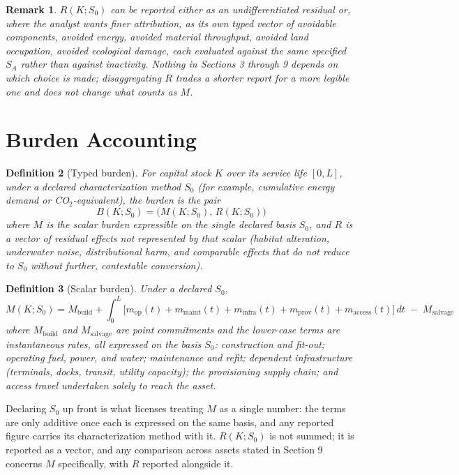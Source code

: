 \documentclass[11pt]{article}
\newtheorem{definition}{Definition}[section]
\newtheorem{remark}[definition]{Remark}
\begin{document}
\begin{remark}
$R(K;S_0)$ can be reported either as an undifferentiated residual or, where the analyst wants finer attribution, as its own typed vector of avoidable components, avoided energy, avoided material throughput, avoided land occupation, avoided ecological damage, each evaluated against the same specified $S_A$ rather than against inactivity. Nothing in Sections 3 through 9 depends on which choice is made; disaggregating $R$ trades a shorter report for a more legible one and does not change what counts as $M$.
\end{remark}

\section{Burden Accounting}

\begin{definition}[Typed burden]
For capital stock $K$ over its service life $[0,L]$, under a declared characterization method $S_0$ (for example, cumulative energy demand or CO$_2$-equivalent), the burden is the pair
\[
B(K;S_0) = \big(M(K;S_0),\, R(K;S_0)\big)
\]
where $M$ is the scalar burden expressible on the single declared basis $S_0$, and $R$ is a vector of residual effects not represented by that scalar (habitat alteration, underwater noise, distributional harm, and comparable effects that do not reduce to $S_0$ without further, contestable conversion).
\end{definition}

\begin{definition}[Scalar burden]
Under a declared $S_0$,
\[
M(K;S_0) = M_{\text{build}} + \int_0^L \big[m_{\text{op}}(t) + m_{\text{maint}}(t) + m_{\text{infra}}(t) + m_{\text{prov}}(t) + m_{\text{access}}(t)\big]\,dt \;-\; M_{\text{salvage}}
\]
where $M_{\text{build}}$ and $M_{\text{salvage}}$ are point commitments and the lower-case terms are instantaneous rates, all expressed on the basis $S_0$: construction and fit-out; operating fuel, power, and water; maintenance and refit; dependent infrastructure (terminals, docks, transit, utility capacity); the provisioning supply chain; and access travel undertaken solely to reach the asset.
\end{definition}

Declaring $S_0$ up front is what licenses treating $M$ as a single number: the terms are only additive once each is expressed on the same basis, and any reported figure carries its characterization method with it. $R(K;S_0)$ is not summed; it is reported as a vector, and any comparison across assets stated in Section 9 concerns $M$ specifically, with $R$ reported alongside it.
\end{document}

